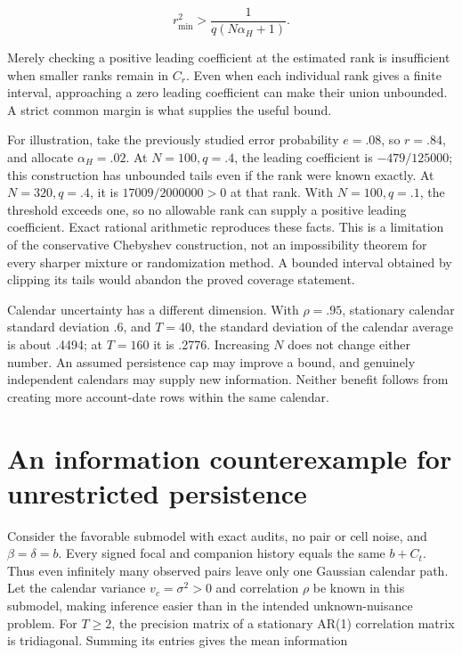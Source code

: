 \[
 r_{\min}^2>\frac1{q(N\alpha_H+1)}.
\]

Merely checking a positive leading coefficient at the estimated rank is
insufficient when smaller ranks remain in \(C_r\). Even when each
individual rank gives a finite interval, approaching a zero leading
coefficient can make their union unbounded. A strict common margin is
what supplies the useful bound.

For illustration, take the previously studied error probability
\(e=.08\), so \(r=.84\), and allocate \(\alpha_H=.02\). At
\(N=100,q=.4\), the leading coefficient is \(-479/125000\); this
construction has unbounded tails even if the rank were known exactly. At
\(N=320,q=.4\), it is \(17009/2000000>0\) at that rank. With
\(N=100,q=.1\), the threshold exceeds one, so no allowable rank can
supply a positive leading coefficient. Exact rational arithmetic
reproduces these facts. This is a limitation of the conservative
Chebyshev construction, not an impossibility theorem for every sharper
mixture or randomization method. A bounded interval obtained by clipping
its tails would abandon the proved coverage statement.

Calendar uncertainty has a different dimension. With \(\rho=.95\),
stationary calendar standard deviation .6, and \(T=40\), the standard
deviation of the calendar average is about .4494; at \(T=160\) it is
.2776. Increasing \(N\) does not change either number. An assumed
persistence cap may improve a bound, and genuinely independent calendars
may supply new information. Neither benefit follows from creating more
account-date rows within the same calendar.

\hypertarget{an-information-counterexample-for-unrestricted-persistence}{%
\section{An information counterexample for unrestricted
persistence}\label{an-information-counterexample-for-unrestricted-persistence}}

Consider the favorable submodel with exact audits, no pair or cell
noise, and \(\beta=\delta=b\). Every signed focal and companion history
equals the same \(b+C_t\). Thus even infinitely many observed pairs
leave only one Gaussian calendar path. Let the calendar variance
\(v_c=\sigma^2>0\) and correlation \(\rho\) be known in this submodel,
making inference easier than in the intended unknown-nuisance problem.
For \(T\geq2\), the precision matrix of a stationary AR(1) correlation
matrix is tridiagonal. Summing its entries gives the mean information

